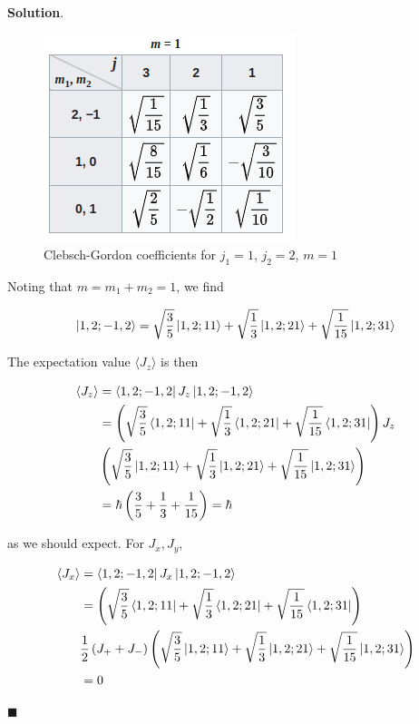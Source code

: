 \documentclass[12pt]{article}
\theoremstyle{definition}
\newenvironment{s}{%
        \begin{trivlist} \item \textbf{Solution}. }{%
            \hspace*{\fill} $\blacksquare$\end{trivlist}}%
\begin{document}
{\begin{s}
\begin{figure}
\centering
\includegraphics[scale=0.75]{cb-table.png}
\caption{Clebsch-Gordon coefficients for $j_{1} = 1$, $j_{2} = 2$, $m=1$}
\end{figure}

Noting that $m = m_1 + m_2 = 1$, we find

\begin{align*}
\ket{1,2;-1,2} = \sqrt{\frac{3}{5}}\ket{1,2;1 1} + \sqrt{\frac{1}{3}}\ket{1,2;2 1} + \sqrt{\frac{1}{15}}\ket{1,2;3 1}
\end{align*}

The expectation value $\langle J_z \rangle$ is then

\begin{align*}
\langle J_z \rangle &= \bra{1,2;-1,2} J_z \ket{1,2;-1,2} \\
&= \left(\sqrt{\frac{3}{5}}\bra{1,2;1 1} + \sqrt{\frac{1}{3}}\bra{1,2;2 1} + \sqrt{\frac{1}{15}}\bra{1,2;3 1}\right)J_{z}\\
&\left(\sqrt{\frac{3}{5}}\ket{1,2;1 1} + \sqrt{\frac{1}{3}}\ket{1,2;2 1} + \sqrt{\frac{1}{15}}\ket{1,2;3 1}\right)\\
&= \hbar\left(\frac{3}{5}+\frac{1}{3}+\frac{1}{15}\right) = \hbar
\end{align*}

as we should expect. For $J_x, J_y$, 

\begin{align*}
\langle J_x \rangle &= \bra{1,2;-1,2} J_x \ket{1,2;-1,2} \\
&= \left(\sqrt{\frac{3}{5}}\bra{1,2;1 1} + \sqrt{\frac{1}{3}}\bra{1,2;2 1} + \sqrt{\frac{1}{15}}\bra{1,2;3 1}\right)\\
&\frac{1}{2}\left(J_+ + J_-\right)\left(\sqrt{\frac{3}{5}}\ket{1,2;1 1} + \sqrt{\frac{1}{3}}\ket{1,2;2 1} + \sqrt{\frac{1}{15}}\ket{1,2;3 1}\right)\\
&= 0
\end{align*}


\end{s}}
\end{document}
